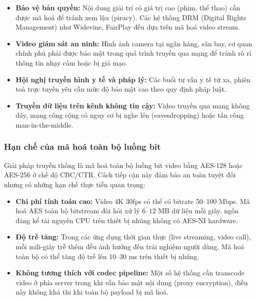 \begin{itemize}
  \item \textbf{Bảo vệ bản quyền:} Nội dung giải trí có giá trị cao (phim, thể thao)
        cần được mã hoá để tránh xem lậu (piracy). Các hệ thống DRM (Digital Rights
        Management) như Widevine, FairPlay đều dựa trên mã hoá video stream.

  \item \textbf{Video giám sát an ninh:} Hình ảnh camera tại ngân hàng, sân bay,
        cơ quan chính phủ phải được bảo mật trong quá trình truyền qua mạng để
        tránh rò rỉ thông tin nhạy cảm hoặc bị giả mạo.

  \item \textbf{Hội nghị truyền hình y tế và pháp lý:} Các buổi tư vấn y tế từ xa,
        phiên toà trực tuyến yêu cầu mức độ bảo mật cao theo quy định pháp luật.

  \item \textbf{Truyền dữ liệu trên kênh không tin cậy:} Video truyền qua mạng
        không dây, mạng công cộng có nguy cơ bị nghe lén (eavesdropping)
        hoặc tấn công man-in-the-middle.
\end{itemize}

\subsubsection{Hạn chế của mã hoá toàn bộ luồng bit}

Giải pháp truyền thống là mã hoá toàn bộ luồng bit video bằng AES-128 hoặc AES-256
ở chế độ CBC/CTR. Cách tiếp cận này đảm bảo an toàn tuyệt đối nhưng có những
hạn chế thực tiễn quan trọng:

\begin{itemize}
  \item \textbf{Chi phí tính toán cao:} Video 4K 30fps có thể có bitrate 50--100 Mbps.
        Mã hoá AES toàn bộ bitstream đòi hỏi xử lý $6$--$12$ MB dữ liệu mỗi giây,
        ngốn đáng kể tài nguyên CPU trên thiết bị nhúng không có AES-NI hardware.

  \item \textbf{Độ trễ tăng:} Trong các ứng dụng thời gian thực (live streaming,
        video call), mỗi mili-giây trễ thêm đều ảnh hưởng đến trải nghiệm người dùng.
        Mã hoá toàn bộ có thể tăng độ trễ lên 10--30 ms trên thiết bị nhúng.

  \item \textbf{Không tương thích với codec pipeline:} Một số hệ thống cần
        transcode video ở phía server trong khi vẫn bảo mật nội dung (proxy encryption),
        điều này không khả thi khi toàn bộ payload bị mã hoá.
\end{itemize}


